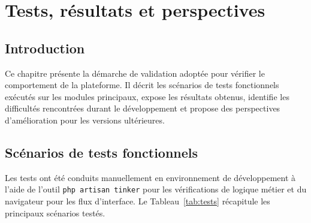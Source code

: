 \documentclass[12pt,a4paper]{report}
\begin{document}
\chapter{Tests, résultats et perspectives}

\section{Introduction}

Ce chapitre présente la démarche de validation adoptée pour vérifier le
comportement de la plateforme. Il décrit les scénarios de tests fonctionnels
exécutés sur les modules principaux, expose les résultats obtenus, identifie
les difficultés rencontrées durant le développement et propose des
perspectives d'amélioration pour les versions ultérieures.

\section{Scénarios de tests fonctionnels}

Les tests ont été conduits manuellement en environnement de développement
à l'aide de l'outil \texttt{php artisan tinker} pour les vérifications de
logique métier et du navigateur pour les flux d'interface. Le Tableau~\ref{tab:tests}
récapitule les principaux scénarios testés.
\end{document}
